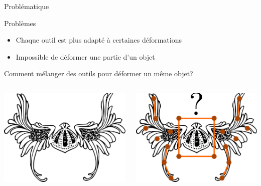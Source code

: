 \documentclass[xcolor=x11names,compress]{beamer}
\renewcommand{\(}{\begin{columns}} \renewcommand{\)}{\end{columns}}
\newcommand{\<}[1]{\begin{column}{#1}} \renewcommand{\>}{\end{column}}
\begin{document}
\begin{frame}{Problématique}
\begin{alertblock}{Problèmes}
  \begin{itemize}
    \item Chaque outil est plus adapté à certaines déformations
    \item Impossible de déformer une partie d'un objet
  \end{itemize}
\end{alertblock}
\pause
Comment mélanger des outils pour déformer un même objet? 
\vspace{0.1in}
\begin{columns}[t]
  \begin{column}{0.5\textwidth}
  \centering
    \includegraphics[scale=0.16]{Outil-Mono-Sans}
  \end{column}
  \pauses
  \begin{column}{0.5\textwidth}
  \centering
    \includegraphics[scale=0.16]{Outil-Multi}
  \end{column}
\end{columns} 
\end{frame}
\end{document}
